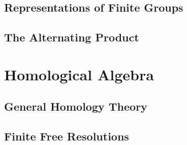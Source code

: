 \documentclass[oneside]{amsbook}
\numberwithin{ex}{chapter}
\begin{document}
\chapter{Representations of Finite Groups}


\chapter{The Alternating Product}


\part{Homological Algebra}
\chapter{General Homology Theory}


\chapter{Finite Free Resolutions}

\end{document}
